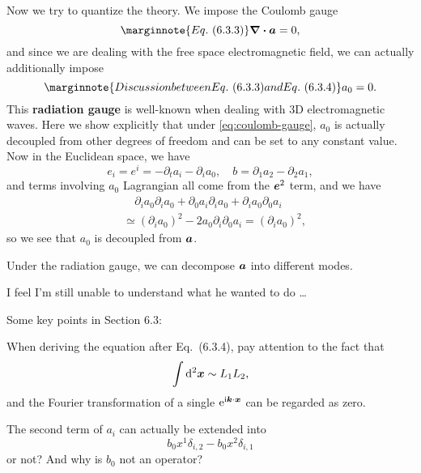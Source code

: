 \documentclass[hyperref, a4paper]{article}
\newcommand*{\ii}{\mathrm{i}}
\newcommand*{\ee}{\mathrm{e}}
\newcommand*{\concept}[1]{{\textbf{#1}}}
\begin{document}
Now we try to quantize the theory.  We impose the Coulomb gauge 
\begin{equation} \marginnote{Eq.~(6.3.3)}
    \div{\vb*{a}} = 0,
    \label{eq:coulomb-gauge}
\end{equation}
and since we are dealing with the free space electromagnetic field, we can actually additionally impose 
\begin{equation} \marginnote{Discussion between Eq.~(6.3.3) and Eq.~(6.3.4)}
    a_0 = 0.
\end{equation}
This \concept{radiation gauge} is well-known when dealing with 3D electromagnetic waves. Here we show explicitly that under 
\eqref{eq:coulomb-gauge}, $a_0$ is actually decoupled from other degrees of freedom and can be set to 
any constant value. Now in the Euclidean space, we have  
\begin{equation}
    e_i = e^i = - \partial_t a_i - \partial_i a_0, \quad b = \partial_1 a_2 - \partial_2 a_1,
\end{equation}
and terms involving $a_0$ Lagrangian all come from the $\vb*{e}^2$ term, and we have 
\[
    \begin{aligned}
        &\quad \partial_i a_0 \partial_i a_0 + \partial_0 a_i \partial_i a_0 + \partial_i a_0 \partial_0 a_i \\
        &\simeq (\partial_i a_0)^2 - 2 a_0 \partial_i \partial_0 a_i 
        = (\partial_i a_0)^2 ,
    \end{aligned}
\]
so we see that $a_0$ is decoupled from $\vb*{a}$. 

Under the radiation gauge, we can decompose $\vb*{a}$ into different modes. 

I feel I'm still unable to understand what he wanted to do \dots 

Some key points in Section 6.3:

When deriving the equation after Eq.~(6.3.4), pay attention to the fact that 
\[
    \int \dd[2]{\vb*{x}} \sim L_1 L_2,
\]
and the Fourier transformation of a single $\ee^{\ii \vb*{k} \cdot \vb*{x}}$ can be regarded as zero. 

The second term of $a_i$ can actually be extended into 
\[
    b_0 x^1 \delta_{i, 2} - b_0 x^2 \delta_{i, 1}
\]
or not? And why is $b_0$ not an operator?


 
\end{document}
